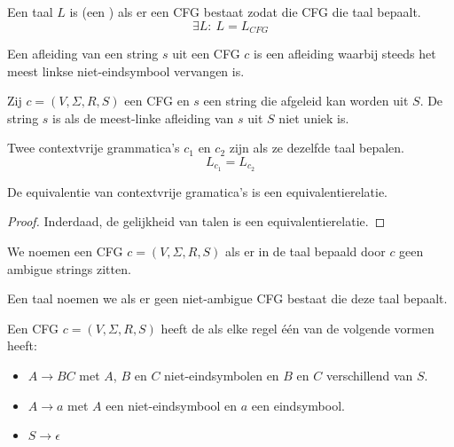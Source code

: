 \documentclass[main.tex]{subfiles}
\begin{document}
\begin{de}
  \label{de:contextvrije-taal}
  Een taal $L$ is  (een ) als er een CFG bestaat zodat die CFG die taal bepaalt.
  \[ \exists L:\ L = L_{CFG} \]
\end{de}

\begin{de}
  Een  afleiding van een string $s$ uit een CFG $c$ is een afleiding waarbij steeds het meest linkse niet-eindsymbool vervangen is.
\end{de}

\begin{de}
  Zij $c = (V,\Sigma,R,S)$ een CFG en $s$ een string die afgeleid kan worden uit $S$.
  De string $s$ is  als de meest-linke afleiding van $s$ uit $S$ niet uniek is. 
\end{de}

\begin{de}
  Twee contextvrije grammatica's $c_{1}$ en $c_{2}$ zijn  als ze dezelfde taal bepalen.
  \[ L_{c_{1}} = L_{c_{2}} \]
\end{de}

\begin{st}
  De equivalentie van contextvrije gramatica's is een equivalentierelatie.

  \begin{proof}
    Inderdaad, de gelijkheid van talen is een equivalentierelatie.
  \end{proof}
\end{st}

\begin{de}
  We noemen een CFG $c = (V,\Sigma,R,S)$  als er in de taal bepaald door $c$ geen ambigue strings zitten.
\end{de}

\begin{de}
  Een taal noemen we  als er geen niet-ambigue CFG bestaat die deze taal bepaalt.
\end{de}

\begin{de}
  \label{de:chomsky-normaal-vorm}
  Een CFG $c = (V,\Sigma,R,S)$ heeft de  als elke regel \'e\'en van de volgende vormen heeft:
  \begin{itemize}
  \item $A \rightarrow BC$ met $A$, $B$ en $C$ niet-eindsymbolen en $B$ en $C$ verschillend van $S$.
  \item $A \rightarrow a$ met $A$ een niet-eindsymbool en $a$ een eindsymbool.
  \item $S \rightarrow \epsilon$
  \end{itemize}
\end{de}
\end{document}
